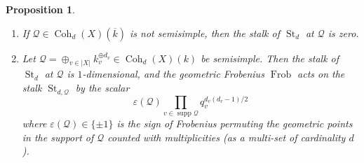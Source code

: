 \documentclass[reqno]{amsart}
\numberwithin{equation}{section}
\DeclareMathOperator{\gFrob}{Frob}
\DeclareMathOperator{\Coh}{Coh}
\DeclareMathOperator{\supp}{supp}
\DeclareMathOperator{\St}{St}
\newcommand{\ov}{\overline}
\newcommand\op{\oplus}
\newcommand{\e}{\varepsilon}
\newcommand\cQ{\mathcal{Q}}
\newtheorem{prop}[thm]{Proposition}
\theoremstyle{remark}
\numberwithin{equation}{section}
\begin{document}
\begin{prop}\label{p:St} 
\begin{enumerate}
\item If $\cQ\in \Coh_{d}(X)(\ov k)$ is not semisimple, then the stalk of $\St_{d}$ at $\cQ$ is zero.
\item Let $\cQ=\op_{v\in |X|}k_v^{\op d_{v}}\in \Coh_{d}(X)(k)$ be semisimple. Then the stalk of  $\St_{d}$ at $\cQ$ is $1$-dimensional, and the geometric Frobenius $\gFrob$ acts on the stalk $\St_{d,\cQ}$ by the scalar
\begin{equation*}
\e(\cQ)\prod_{v\in \supp\cQ}q_{v}^{d_{v}(d_{v}-1)/2}
\end{equation*}
where $\e(\cQ)\in\{\pm1\}$ is the sign of Frobenius permuting the geometric points in the support of $\cQ$ counted with multiplicities (as a multi-set of cardinality $d$).
\end{enumerate}
\end{prop}
\end{document}
